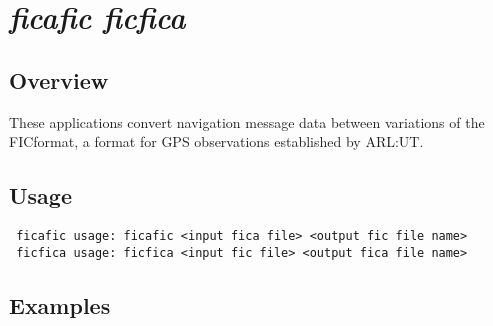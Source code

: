 %
%

\section{\emph{ficafic ficfica}}
\subsection{Overview}
These applications convert navigation message data between variations of the FICformat, a format for GPS observations established by ARL:UT.

\subsection{Usage}
\begin{\outputsize}
\begin{verbatim}
 ficafic usage: ficafic <input fica file> <output fic file name>
 ficfica usage: ficfica <input fic file> <output fica file name>
\end{verbatim}
\end{\outputsize}

\subsection{Examples}

